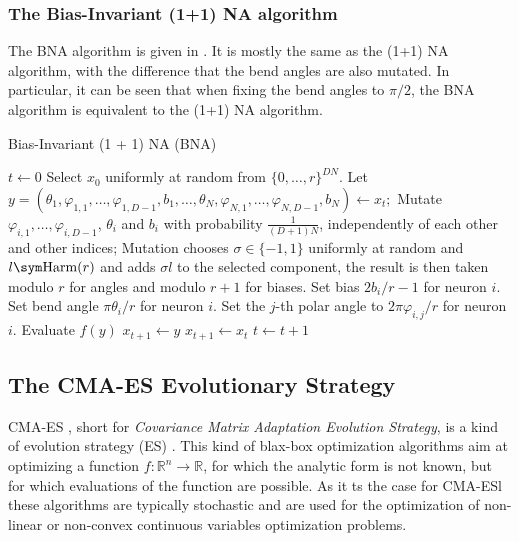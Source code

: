 \subsubsection{The Bias-Invariant (1+1) NA algorithm}

The BNA algorithm is given in .
It is mostly the same as the (1+1) NA algorithm, with the difference that the bend angles are also mutated.
In particular, it can be seen that when fixing the bend angles to $\pi / 2$, the BNA algorithm is equivalent to the (1+1) NA algorithm.

\begin{algorithm}
    \caption{Bias-Invariant (1 + 1) NA (BNA)}
\label{alg:bna}
\begin{algorithmic}
    \State $t \gets 0$
    \State Select $x_0$ uniformly at random from $\{0, \ldots, r\}^{DN}$.
        \State Let $y = (\theta_1, \varphi_{1,1}, \ldots, \varphi_{1,D-1}, b_1, \ldots, \theta_N, \varphi_{N,1}, \ldots, \varphi_{N,D-1}, b_N) \gets x_t;$
            \State Mutate $\varphi_{i,1}, \dots, \varphi_{i,D-1}$, $\theta_i$ and $b_i$ with probability $\frac{1}{(D+1) N}$, independently of each other and other indices;
            \State Mutation chooses $\sigma \in \{-1, 1\}$ uniformly at random and $l \sym \text{Harm}(r)$ and adds $\sigma l$ to the selected component, the
            result is then taken modulo $r$ for angles and modulo $r + 1$ for biases.
                \State Set bias $2b_i / r - 1$ for neuron $i$.
                \State Set bend angle $\pi \theta_i / r$ for neuron $i$.
                    \State Set the $j$-th polar angle to $2\pi \varphi_{i,j} / r$ for neuron $i$.
                \EndFor
            \EndFor
            \State Evaluate $f(y)$
                \State $x_{t+1} \gets y$
            \Else
                \State $x_{t+1} \gets x_t$
            \EndIf
        \EndFor
        \State $t \gets t + 1$
    \EndWhile
\end{algorithmic}
\end{algorithm}

\subsection{The CMA-ES Evolutionary Strategy}

CMA-ES \cite{cmaes}, short for \textit{Covariance Matrix Adaptation Evolution Strategy}, is a kind of evolution strategy (ES) \cite{es_intro}.
This kind of blax-box optimization algorithms aim at optimizing a function $f : \mathds{R}^n \to \mathds{R}$, for which the analytic form is not known,
but for which evaluations of the function are possible. As it ts the case for CMA-ESl these algorithms are typically stochastic and are used for the optimization of
non-linear or non-convex continuous variables optimization problems.

